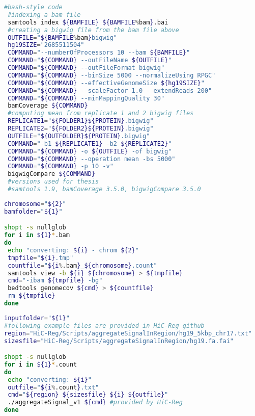 \begin{lstlisting}[language=bash, caption=Bam to bigwig, label=list:methods:bamtobigwig]
 #bash-style code
 #indexing a bam file
 samtools index ${BAMFILE} ${BAMFILE%bam}.bai
 #creating a bigwig file from the bam file above
 OUTFILE="${BAMFILE%bam}bigwig"
 hg19SIZE="2685511504"
 COMMAND="--numberOfProcessors 10 --bam ${BAMFILE}" 
 COMMAND="${COMMAND} --outFileName ${OUTFILE}"
 COMMAND="${COMMAND} --outFileFormat bigwig" 
 COMMAND="${COMMAND} --binSize 5000 --normalizeUsing RPGC"
 COMMAND="${COMMAND} --effectiveGenomeSize ${hg19SIZE}"
 COMMAND="${COMMAND} --scaleFactor 1.0 --extendReads 200"
 COMMAND="${COMMAND} --minMappingQuality 30"
 bamCoverage ${COMMAND}
 #computing mean from replicate 1 and 2 bigwig files
 REPLICATE1="${FOLDER1}${PROTEIN}.bigwig"
 REPLICATE2="${FOLDER2}${PROTEIN}.bigwig"
 OUTFILE="${OUTFOLDER}${PROTEIN}.bigwig"
 COMMAND="-b1 ${REPLICATE1} -b2 ${REPLICATE2}"
 COMMAND="${COMMAND} -o ${OUTFILE} -of bigwig"
 COMMAND="${COMMAND} --operation mean -bs 5000"
 COMMAND="${COMMAND} -p 10 -v"
 bigwigCompare ${COMMAND}
 #versions used for thesis
 #samtools 1.9, bamCoverage 3.5.0, bigwigCompare 3.5.0
\end{lstlisting}

\begin{lstlisting}[language=bash, caption=Bam to bedgraph, label=list:methods:bam2bedgraph]
chromosome="${2}"
bamfolder="${1}"

shopt -s nullglob
for i in ${1}*.bam
do
 echo "converting: ${i} - chrom ${2}"
 tmpfile="${i}.tmp"
 countfile="${i%.bam}_${chromosome}.count"
 samtools view -b ${i} ${chromosome} > ${tmpfile}
 cmd="-ibam ${tmpfile} -bg"
 bedtools genomecov ${cmd} > ${countfile}
 rm ${tmpfile}
done
\end{lstlisting}
\begin{lstlisting}[language=bash, caption=Bedgraph to HiC-Reg input format, label=list:methods:bedgraph2hicreg]
inputfolder="${1}"
#following example files are provided in HiC-Reg github
region="HiC-Reg/Scripts/aggregateSignalInRegion/hg19_5kbp_chr17.txt"
sizesfile="HiC-Reg/Scripts/aggregateSignalInRegion/hg19.fa.fai"

shopt -s nullglob
for i in ${1}*.count
do
 echo "converting: ${i}"
 outfile="${i%.count}.txt"
 cmd="${region} ${sizesfile} ${i} ${outfile}"
 ./aggregateSignal_v1 ${cmd} #provided by HiC-Reg
done
\end{lstlisting}

